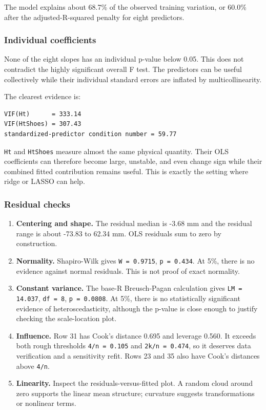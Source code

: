 ﻿\documentclass[11pt]{article}
\begin{document}
The model explains about 68.7\% of the observed training variation, or 60.0\% after
the adjusted-R-squared penalty for eight predictors.

\subsubsection{Individual coefficients}

None of the eight slopes has an individual p-value below 0.05. This does not
contradict the highly significant overall F test. The predictors can be useful
collectively while their individual standard errors are inflated by
multicollinearity.

The clearest evidence is:

\begin{lstlisting}
VIF(Ht)      = 333.14
VIF(HtShoes) = 307.43
standardized-predictor condition number = 59.77
\end{lstlisting}

\texttt{Ht} and \texttt{HtShoes} measure almost the same physical quantity. Their OLS
coefficients can therefore become large, unstable, and even change sign while
their combined fitted contribution remains useful. This is exactly the setting
where ridge or LASSO can help.

\subsubsection{Residual checks}

\begin{enumerate}
\item \textbf{Centering and shape.} The residual median is -3.68 mm and the residual range
is about -73.83 to 62.34 mm. OLS residuals sum to zero by construction.
\item \textbf{Normality.} Shapiro-Wilk gives \texttt{W = 0.9715}, \texttt{p = 0.434}. At 5\%, there is no
evidence against normal residuals. This is not proof of exact normality.
\item \textbf{Constant variance.} The base-R Breusch-Pagan calculation gives
\texttt{LM = 14.037}, \texttt{df = 8}, \texttt{p = 0.0808}. At 5\%, there is no statistically
significant evidence of heteroscedasticity, although the p-value is close
enough to justify checking the scale-location plot.
\item \textbf{Influence.} Row 31 has Cook's distance 0.695 and leverage 0.560. It exceeds
both rough thresholds \texttt{4/n = 0.105} and \texttt{2k/n = 0.474}, so it deserves data
verification and a sensitivity refit. Rows 23 and 35 also have Cook's
distances above \texttt{4/n}.
\item \textbf{Linearity.} Inspect the residuals-versus-fitted plot. A random cloud around
zero supports the linear mean structure; curvature suggests transformations
or nonlinear terms.
\end{enumerate}
\end{document}

